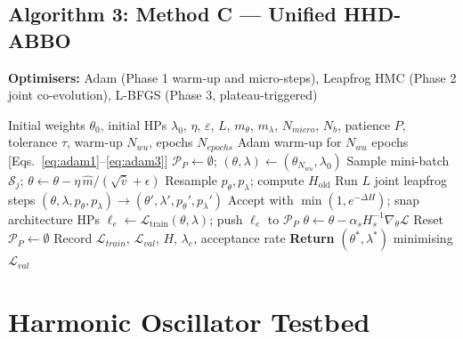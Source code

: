 \documentclass[11pt]{article}
\theoremstyle{definition}
\newcommand{\calP}{\mathcal{P}}
\begin{document}
\subsection{Algorithm 3: Method C --- Unified HHD-ABBO}
\begin{algorithm}[H]
\caption{Method C --- Unified HHD-ABBO}
\label{alg:unified}
\textbf{Optimisers:} Adam (Phase 1 warm-up and micro-steps),
Leapfrog HMC (Phase 2 joint co-evolution),
L-BFGS (Phase 3, plateau-triggered)
\begin{algorithmic}[1]
\Require Initial weights $\theta_0$, initial HPs $\lambda_0$,
         $\eta$, $\varepsilon$, $L$, $m_\theta$, $m_\lambda$,
         $N_{micro}$, $N_b$, patience $P$, tolerance $\tau$,
         warm-up $N_{wu}$, epochs $N_{epochs}$
\State Adam warm-up for $N_{wu}$ epochs [Eqs.~\eqref{eq:adam1}--\eqref{eq:adam3}]
\State $\calP_P \leftarrow \emptyset$;
       $(\theta, \lambda) \leftarrow (\theta_{N_{wu}}, \lambda_0)$
    \State Sample mini-batch $\mathcal{S}_j$;
      $\theta \leftarrow \theta
        - \eta\,\hat{m}/(\sqrt{\hat{v}}+\epsilon)$
  \EndFor
  \State Resample $p_\theta, p_\lambda$; compute $H_{\mathrm{old}}$
    \hfill{}
  \State Run $L$ joint leapfrog steps
    $(\theta,\lambda,p_\theta,p_\lambda)\to(\theta',\lambda',p_\theta',p_\lambda')$
  \State Accept with $\min(1,e^{-\Delta H})$; snap architecture HPs
  \State $\ell_e \leftarrow \mathcal{L}_{\mathrm{train}}(\theta,\lambda)$;
    push $\ell_e$ to $\calP_P$
  \If{$|\calP_P|\ge P$ \textbf{and}
      $(\ell_{e-P}-\ell_e)/\ell_{e-P} < \tau$}
      \State $\theta \leftarrow \theta
        - \alpha_s H_s^{-1}\nabla_\theta\mathcal{L}$
    \EndFor
    \State Reset $\calP_P \leftarrow \emptyset$
  \EndIf
  \State Record $\mathcal{L}_{train}$, $\mathcal{L}_{val}$,
    $H$, $\lambda_e$, acceptance rate
\EndFor
\State \textbf{Return} $(\theta^*, \lambda^*)$ minimising $\mathcal{L}_{val}$
\end{algorithmic}
\end{algorithm}


\section{Harmonic Oscillator Testbed}
\end{document}
